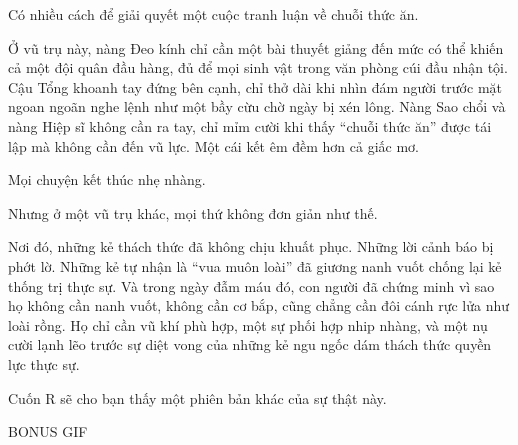 \documentclass[../main.tex]{subfiles}
\begin{document}
\il

Có nhiều cách để giải quyết một cuộc tranh luận về chuỗi thức ăn.

Ở vũ trụ này, nàng Đeo kính chỉ cần một bài thuyết giảng đến mức có thể khiến cả một đội quân đầu hàng, đủ để mọi sinh vật trong văn phòng cúi đầu nhận tội. Cậu Tổng khoanh tay đứng bên cạnh, chỉ thở dài khi nhìn đám người trước mặt ngoan ngoãn nghe lệnh như một bầy cừu chờ ngày bị xén lông. Nàng Sao chổi và nàng Hiệp sĩ không cần ra tay, chỉ mỉm cười khi thấy ``chuỗi thức ăn'' được tái lập mà không cần đến vũ lực. Một cái kết êm đềm hơn cả giấc mơ.

Mọi chuyện kết thúc nhẹ nhàng.

Nhưng ở một vũ trụ khác, mọi thứ không đơn giản như thế.

Nơi đó, những kẻ thách thức đã không chịu khuất phục. Những lời cảnh báo bị phớt lờ. Những kẻ tự nhận là ``vua muôn loài'' đã giương nanh vuốt chống lại kẻ thống trị thực sự. Và trong ngày đẫm máu đó, con người đã chứng minh vì sao họ không cần nanh vuốt, không cần cơ bắp, cũng chẳng cần đôi cánh rực lửa như loài rồng. Họ chỉ cần vũ khí phù hợp, một sự phối hợp nhip nhàng, và một nụ cười lạnh lẽo trước sự diệt vong của những kẻ ngu ngốc dám thách thức quyền lực thực sự.

Cuốn R sẽ cho bạn thấy một phiên bản khác của sự thật này.

\begin{center}
  {\ab BONUS GIF}
\end{center}
\end{document}
